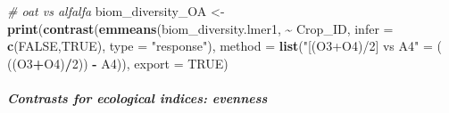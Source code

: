 \documentclass[
]{article}
\newenvironment{Shaded}{\begin{snugshade}}{\end{snugshade}}
\newcommand{\AttributeTok}[1]{\textcolor[rgb]{0.13,0.29,0.53}{#1}}
\newcommand{\CommentTok}[1]{\textcolor[rgb]{0.56,0.35,0.01}{\textit{#1}}}
\newcommand{\ConstantTok}[1]{\textcolor[rgb]{0.56,0.35,0.01}{#1}}
\newcommand{\DecValTok}[1]{\textcolor[rgb]{0.00,0.00,0.81}{#1}}
\newcommand{\FunctionTok}[1]{\textcolor[rgb]{0.13,0.29,0.53}{\textbf{#1}}}
\newcommand{\NormalTok}[1]{#1}
\newcommand{\OtherTok}[1]{\textcolor[rgb]{0.56,0.35,0.01}{#1}}
\newcommand{\SpecialCharTok}[1]{\textcolor[rgb]{0.81,0.36,0.00}{\textbf{#1}}}
\newcommand{\StringTok}[1]{\textcolor[rgb]{0.31,0.60,0.02}{#1}}
\begin{document}
\begin{Shaded}
\begin{Highlighting}[]
\CommentTok{\# oat vs alfalfa}
\NormalTok{biom\_diversity\_OA }\OtherTok{\textless{}{-}} \FunctionTok{print}\NormalTok{(}\FunctionTok{contrast}\NormalTok{(}\FunctionTok{emmeans}\NormalTok{(biom\_diversity.lmer1, }\SpecialCharTok{\textasciitilde{}}\NormalTok{ Crop\_ID,}
                                            \AttributeTok{infer =} \FunctionTok{c}\NormalTok{(}\ConstantTok{FALSE}\NormalTok{,}\ConstantTok{TRUE}\NormalTok{), }
                                            \AttributeTok{type =} \StringTok{"response"}\NormalTok{), }
                                    \AttributeTok{method =} \FunctionTok{list}\NormalTok{(}\StringTok{"[(O3+O4)/2] vs A4"} \OtherTok{=}\NormalTok{ ( ((O3}\SpecialCharTok{+}\NormalTok{O4)}\SpecialCharTok{/}\DecValTok{2}\NormalTok{)) }\SpecialCharTok{{-}}\NormalTok{ A4)),}
                           \AttributeTok{export =} \ConstantTok{TRUE}\NormalTok{)}
\end{Highlighting}
\end{Shaded}

\subparagraph{Contrasts for ecological indices: evenness}\label{contrasts-for-ecological-indices-evenness}
\end{document}
